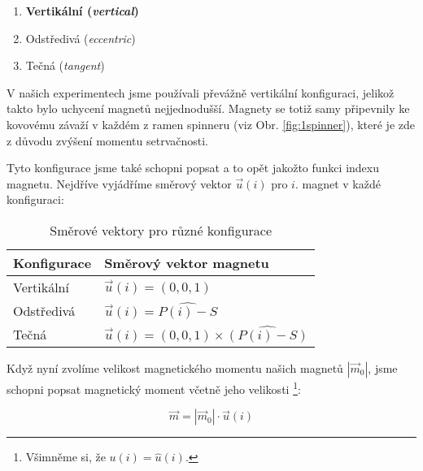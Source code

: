 \documentclass[12pt, a4paper,
 twoside,        %
 openright
]{report}
\begin{document}
\begin{enumerate}[topsep=0pt, partopsep=0pt]
    \setlength{\itemsep}{0pt}%
    \setlength{\parskip}{0pt}%
    \item \textbf{Vertikální (\textit{vertical})}
    \item Odstředivá (\textit{eccentric})
    \item Tečná (\textit{tangent})
\end{enumerate}

V našich experimentech jsme používali převážně vertikální konfiguraci, jelikož takto bylo uchycení magnetů nejjednodušší.
Magnety se totiž samy připevnily ke kovovému závaží v každém z ramen spinneru (viz Obr. \ref{fig:1spinner}), které je zde z důvodu zvýšení momentu setrvačnosti.

Tyto konfigurace jsme také schopni popsat a to opět jakožto funkci indexu magnetu.
Nejdříve vyjádříme směrový vektor $\vec{u}(i)$ pro $i$. magnet v každé konfiguraci:

\vspace{24pt}

\begin{table}[!ht]
    \captionsetup{justification=raggedright,singlelinecheck=off}
    \caption{Směrové vektory pro různé konfigurace}
    \label{tab:mag_dir_vec}

    \def\arraystretch{1.5}
    \begin{tabularx}{\textwidth}{p{} p{} }
        \textbf{Konfigurace} & \textbf{Směrový vektor magnetu}                    \\
        \hline
        Vertikální           & $\vec{u}(i) = (0,0,1)$                             \\
        Odstředivá           & $\vec{u}(i) = \widehat{P(i) - S}$                  \\
        Tečná                & $\vec{u}(i) = (0,0,1) \times \widehat{(P(i) - S)}$ \\
    \end{tabularx}
\end{table}

{\raggedright
Když nyní zvolíme velikost magnetického momentu našich magnetů $|\vec{m}_0|$, jsme schopni popsat magnetický moment včetně jeho velikosti \footnote{Všimněme si, že $u(i) = \hat{u}(i)$.}:}

\begin{equation}
    \label{eq:magnet_moment_orientation}
    \vec{m} = |\vec{m}_0| \cdot \vec{u}(i)
\end{equation}
\end{document}
